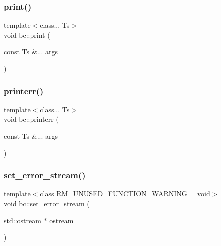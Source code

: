 \mbox{\label{namespacebc_ae22a53f8f6cd6e96082822fa69f5e97e}} 
\subsubsection{\texorpdfstring{print()}{print()}}
{\footnotesize\ttfamily template$<$class... Ts$>$ \\
void bc\+::print (\begin{DoxyParamCaption}\item[{const Ts \&...}]{args }\end{DoxyParamCaption})}

\mbox{\label{namespacebc_aa0e5d3f520d36704b31391c582e31959}} 
\subsubsection{\texorpdfstring{printerr()}{printerr()}}
{\footnotesize\ttfamily template$<$class... Ts$>$ \\
void bc\+::printerr (\begin{DoxyParamCaption}\item[{const Ts \&...}]{args }\end{DoxyParamCaption})}

\mbox{\label{namespacebc_ad394a7001658f17912a9facdef966740}} 
\subsubsection{\texorpdfstring{set\+\_\+error\+\_\+stream()}{set\_error\_stream()}}
{\footnotesize\ttfamily template$<$class R\+M\+\_\+\+U\+N\+U\+S\+E\+D\+\_\+\+F\+U\+N\+C\+T\+I\+O\+N\+\_\+\+W\+A\+R\+N\+I\+NG  = void$>$ \\
void bc\+::set\+\_\+error\+\_\+stream (\begin{DoxyParamCaption}\item[{std\+::ostream $\ast$}]{ostream }\end{DoxyParamCaption})\hspace{0.3cm}{\ttfamily [inline]}}

\mbox{\label{namespacebc_a0990b0a9f4f36164af3631f2ab4ce0ab}} 
